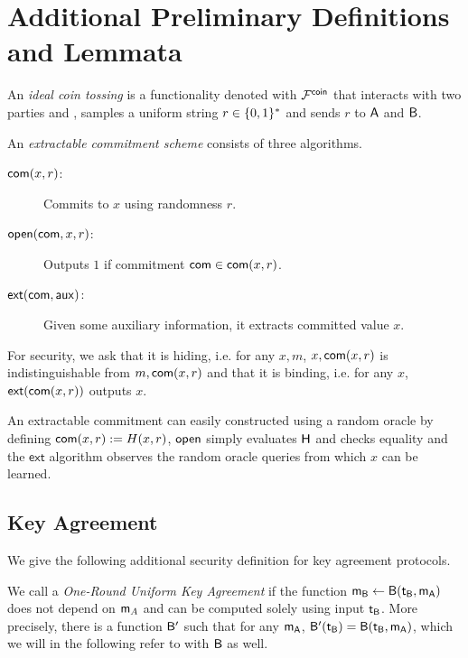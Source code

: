 \section{Additional Preliminary Definitions and Lemmata}\label{sec:defsandlems}

\begin{definition}\label{def:coin}
An \emph{ideal coin tossing} is a functionality denoted with $\mathcal{F}^{\mathsf{coin}}$ that interacts with two parties \A and \B, samples a uniform string $r\in\{0,1\}^*$ and sends $r$ to $\mathsf{A}$ and $\mathsf{B}$.
\end{definition}

\newcommand{\extract}{\ensuremath{\mathsf{ext}}\xspace}

\begin{definition}\label{def:com}
An \emph{extractable commitment scheme} consists of three algorithms.
\begin{description}
\item[$\mathsf{com}(x,r)$:] Commits to $x$ using randomness $r$. 
\item[$\mathsf{open}(\mathsf{com},x,r)$:] Outputs $1$ if commitment $\mathsf{com}\in\mathsf{com}(x,r)$.
\item[$\extract(\com,\aux)$:] Given some auxiliary information, it extracts committed value $x$. 
\end{description}
For security, we ask that it is hiding, i.e. for any $x,m$, $x, \mathsf{com}(x,r)$ is indistinguishable from $m,\mathsf{com}(x,r)$ and that it is binding, i.e. for any $x$, $\extract(\com(x,r))$ outputs $x$.
\end{definition}

An extractable commitment can easily constructed using a random oracle by defining $\mathsf{com}(x,r):=H(x,r)$, $\mathsf{open}$ simply evaluates $\mathsf{H}$ and checks equality and the $\extract$ algorithm observes the random oracle queries from which $x$ can be learned.

\subsection{Key Agreement}\label{sec:addKA}
We give the following additional security definition for key agreement protocols.

\begin{definition}
We call a \UKA \emph{One-Round Uniform Key Agreement} if the function $\mathsf{m}_{\mathsf{B}}\leftarrow\mathsf{B}(\mathsf{t}_{\mathsf{B}},\mathsf{m}_\mathsf{A})$ does not depend on $\mathsf{m}_A$ and can be computed solely using input $\mathsf{t}_{\mathsf{B}}$. More precisely, there is a function $\mathsf{B}'$ such that for any $\mathsf{m}_{\mathsf{A}}$, $\mathsf{B}'(\mathsf{t}_{\mathsf{B}})=\mathsf{B}(\mathsf{t}_{\mathsf{B}},\mathsf{m}_{\mathsf{A}})$, which we will in the following refer to with $\mathsf{B}$ as well. 
\end{definition}

